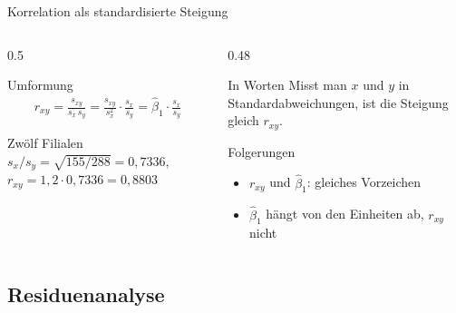 \documentclass[aspectratio=169,11pt]{beamer}
\begin{document}
\begin{frame}{Korrelation als standardisierte Steigung}
  \begin{columns}[T]
    \begin{column}{0.5\textwidth}
      \begin{block}{Umformung}
        \vspace{-8pt}
        \begin{align*}
          r_{xy} = \frac{s_{xy}}{s_x\,s_y}
            = \frac{s_{xy}}{s_x^{2}} \cdot \frac{s_x}{s_y}
            = \hat{\beta}_1 \cdot \frac{s_x}{s_y}
        \end{align*}
        \vspace{-12pt}
      \end{block}
      \begin{exampleblock}{Zwölf Filialen}
        $s_x/s_y = \sqrt{155/288} = 0{,}7336$, \quad
        $r_{xy} = 1{,}2 \cdot 0{,}7336 = 0{,}8803$ \checkmark
      \end{exampleblock}
    \end{column}
    \begin{column}{0.48\textwidth}
      \begin{block}{In Worten}
        Misst man $x$ und $y$ in Standardabweichungen, ist die Steigung
        gleich $r_{xy}$.
      \end{block}
      \begin{alertblock}{Folgerungen}
        \begin{itemize}
          \item $r_{xy}$ und $\hat{\beta}_1$: gleiches Vorzeichen
          \item $\hat{\beta}_1$ hängt von den Einheiten ab, $r_{xy}$ nicht
        \end{itemize}
      \end{alertblock}
    \end{column}
  \end{columns}
\end{frame}

\subsection{Residuenanalyse}
\end{document}
